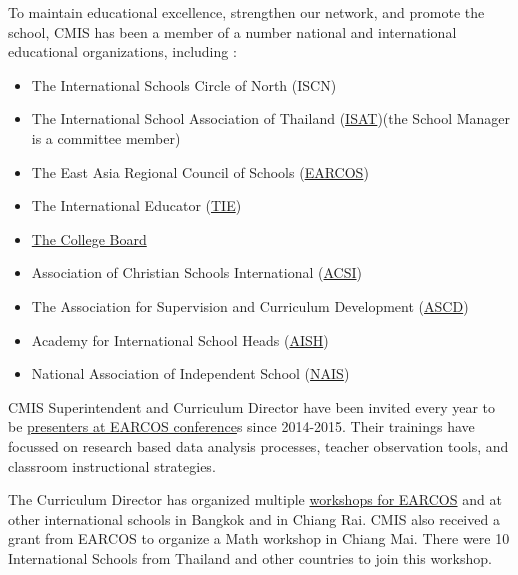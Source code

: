 \begin{findings}

To maintain educational excellence, strengthen our network, and promote the school, CMIS has been a member of a number national and international educational organizations, including :

\begin{itemize}
\item The International Schools Circle of North (ISCN)
\item The International School Association of Thailand (\href{http://gallery.cmis.ac.th/2016-2017/ISAT-Regional-Meeting/}{ISAT})(the School Manager is a committee member)
\item The East Asia Regional Council of Schools (\href{https://www.earcos.org/}{EARCOS})
\item The International Educator (\href{https://www.tieonline.com/}{TIE})
\item \href{https://www.collegeboard.org/}{The College Board}
\item Association of Christian Schools International (\href{https://www.acsi.org/}{ACSI})
\item The Association for Supervision and Curriculum Development (\href{http://www.ascd.org/Default.aspx}{ASCD})
\item Academy for International School Heads (\href{http://www.academyish.org/}{AISH})
\item National Association of Independent School (\href{http://www.nais.org/Pages/default.aspx}{NAIS}) 
\end{itemize}


CMIS Superintendent and Curriculum Director have been invited every year to be \href{http://www.earcos.org/etc2017/etc-teachers.php}{presenters at EARCOS conference}s since 2014-2015. Their trainings have focussed on research based data analysis processes, teacher observation tools, and classroom instructional strategies. 

The Curriculum Director has organized multiple \href{http://blogs.cmis.ac.th/newsletter/2016/11/29/cmis-sponsors-earcos-mathematics-workshop/}{workshops for EARCOS} and at other international schools in Bangkok and in Chiang Rai. CMIS also received a grant from EARCOS to organize a Math workshop in Chiang Mai. There were 10 International Schools from Thailand and other countries to join this workshop.



\end{findings}
